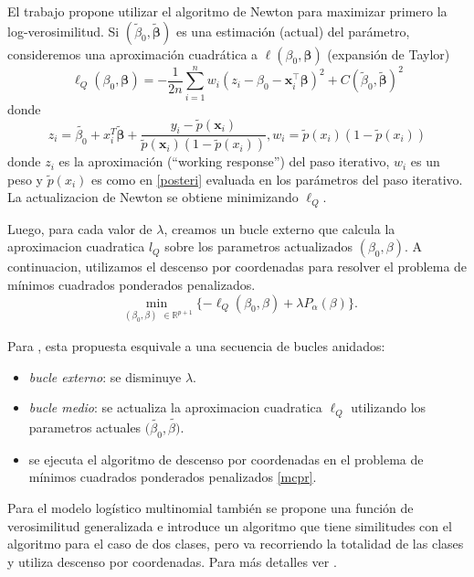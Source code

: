\documentclass{report}
\begin{document}
El trabajo \cite{friedman2010} propone utilizar el algoritmo de Newton para maximizar primero la log-verosimilitud.  Si $(\tilde{\beta}_0, \tilde{\boldsymbol{\beta}})$ es una estimación (actual) del parámetro, consideremos una aproximación cuadrática a  $	\ell(\beta_0, \boldsymbol{\beta}) $ (expansión de Taylor)
\begin{equation}
\ell_Q(\beta_0, \boldsymbol{\beta}) = -\frac{1}{2n} \sum_{i=1}^{n} w_i (z_i - \beta_0 - \mathbf{x}_i^\top \boldsymbol{\beta})^2 + C(\tilde{\beta}_0, \tilde{\boldsymbol{\beta}})^2
\end{equation}
donde 
\begin{equation}
z_i = \tilde{\beta_0} + x^T_i \tilde{\boldsymbol{\beta}} + \frac{y_i - \tilde{p}(\mathbf{x}_i)}{\tilde{p}(\mathbf{x}_i)(1 - \tilde{p}(x_i))}, w_i = \tilde{p}(x_i)(1 - \tilde{p}(x_i)) 
\end{equation}
donde $z_i$ es la aproximación (``working response'') del paso iterativo, $w_i$ es un peso y  $\tilde{p}(x_i)$ es como en \eqref{posteri} evaluada en los parámetros del paso iterativo.  La actualizacion de Newton se obtiene minimizando $\ell_Q$. 

Luego, para cada valor de $\lambda$, creamos un bucle externo que calcula la aproximacion cuadratica $l_Q$ sobre los parametros actualizados $(\beta_0, \beta)$. A continuacion, utilizamos el descenso por coordenadas para resolver el problema de mínimos cuadrados ponderados penalizados.	
\begin{equation}\label{mcpr}
\min_{\substack{(\beta_0, \beta)} \in \mathbb{R}^{p+1}} \{ -\ell_Q(\beta_0, \beta) + \lambda P_\alpha(\beta) \}.
\end{equation}	

Para \cite{friedman2010}, esta propuesta esquivale a una secuencia de bucles anidados: 

\begin{itemize}
	\item {\it bucle externo}: se disminuye $\lambda$.
	\item {\it bucle medio}:   se actualiza la aproximacion cuadratica $\ell_Q$ utilizando los parametros actuales $(\tilde{\beta_0}, \tilde{\beta)}$.
	\item 	 se ejecuta el algoritmo de descenso por coordenadas en el problema de mínimos cuadrados ponderados penalizados \eqref{mcpr}.
\end{itemize}	
 
 
 
 Para el modelo logístico multinomial también se  propone una función de verosimilitud generalizada e introduce un algoritmo que tiene similitudes con el algoritmo para el caso de dos clases, pero va recorriendo la totalidad de las clases y utiliza descenso por coordenadas. Para más detalles ver  \cite{friedman2010}.
 
\end{document}
